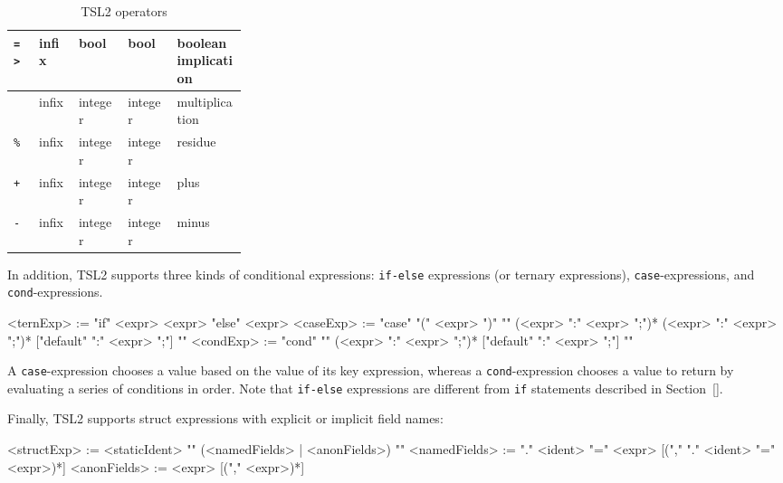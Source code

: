 \documentclass{report}
\newcommand{\src}[1]{\texttt{#1}}
\newcommand{\tsl}{TSL2 }
\begin{document}
\begin{table}
\begin{small}
\begin{tabular}{|l|l|l|l|p{0.3\linewidth}|}
    \hline    
    {\tt\verb#=>#}                   & infix   & bool           & bool           & boolean implication\\
    \hline    
    {\tt*}                           & infix   & integer        & integer        & multiplication \\
    \hline    
    {\tt\%}                          & infix   & integer        & integer        & residue \\
    \hline    
    {\tt+}                           & infix   & integer        & integer        & plus \\
    \hline    
    {\tt-}                           & infix   & integer        & integer        & minus \\
    \hline
\end{tabular}
\end{small}
\caption{\tsl operators}\label{t:ops}
\end{table}

In addition, \tsl supports three kinds of conditional expressions: 
\src{if-else} expressions (or ternary expressions), 
\src{case}-expressions, and \src{cond}-expressions.  

\begin{bnflisting}{}
<ternExp> := "if" <expr> <expr> "else" <expr>
<caseExp> := "case" "(" <expr> ")" "{" (<expr> ":" <expr> ";")* 
                 (<expr> ":" <expr> ";")* 
                 ["default" ":" <expr> ";"]
            "}"
<condExp> := "cond" "{"
                  (<expr>    ":" <expr> ";")*
                  ["default" ":" <expr> ";"]
              "}"
\end{bnflisting}

A \src{case}-expression chooses a value based on the value of its 
key expression, whereas a \src{cond}-expression chooses a value to 
return by evaluating a series of conditions in order.  Note that 
\src{if-else} expressions are different from \src{if} statements 
described in Section~\ref{}.

Finally, \tsl supports struct expressions with explicit or implicit 
field names:

\begin{bnflisting}{}
<structExp>   := <staticIdent> "{" 
                     (<namedFields> | <anonFields>) 
                 "}"
<namedFields> := "." <ident> "=" <expr> 
                 [("," "." <ident> "=" <expr>)*]
<anonFields> := <expr> 
                 [("," <expr>)*]
\end{bnflisting}
\end{document}
